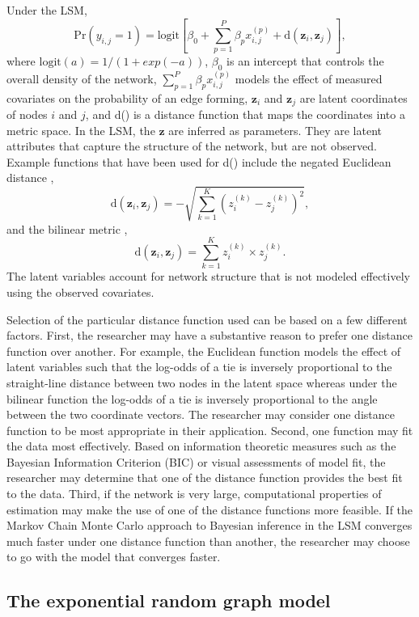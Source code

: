 \documentclass[fleqn,12pt]{wlscirep}
\begin{document}
Under the LSM, $$\text{Pr}(y_{i,j} = 1) = \text{logit}\left[\beta_0 + \sum_{p = 1}^P \beta_p x_{i,j}^{(p)} + \text{d}(\bm{z}_i,\bm{z}_j) \right],$$ where  $\text{logit}(a) = 1/(1+exp(-a))$, $\beta_0$ is an intercept that controls the overall density of the network, $\sum_{p = 1}^P \beta_p x_{i,j}^{(p)}$ models the effect of measured covariates on the probability of an edge forming,  $\bm{z}_i$ and $\bm{z}_j$ are latent coordinates of nodes $i$ and $j$, and d() is a distance function that maps the coordinates into a metric space. In the LSM, the $\bm{z}$ are inferred as parameters. They are latent attributes that capture the structure of the network, but are not observed. Example functions that have been used for d() include the negated Euclidean distance \citep[e.g., ][]{mahmood2017will}, $$ \text{d}(\bm{z}_i,\bm{z}_j)  = -\sqrt{ \sum_{k=1}^K \left( z_i^{(k)} - z_j^{(k)} \right)^2}, $$ and the bilinear metric \citep[e.g., ][]{vance2009social}, $$ \text{d}(\bm{z}_i,\bm{z}_j)  =  \sum_{k=1}^K  z_i^{(k)}\times z_j^{(k)}.  $$ The latent variables account for network structure that is not modeled effectively using the observed covariates. 

Selection of the particular distance function used can be based on a few different factors. First, the researcher may have a substantive reason to prefer one distance function over another. For example, the Euclidean function models the effect of latent variables such that the log-odds of a tie is inversely proportional to the straight-line distance between two nodes in the latent space whereas under the bilinear function the log-odds of a tie is inversely proportional to the angle between the two coordinate vectors. The researcher may consider one distance function to be most appropriate in their application. Second, one function may fit the data most effectively. Based on information theoretic measures such as the Bayesian Information Criterion (BIC) \citep{wang2009wilcoxon} or visual assessments of model fit, the researcher may determine that one of the distance function provides the best fit to the data. Third, if the network is very large, computational properties of estimation may make the use of one of the distance functions more feasible. If the Markov Chain Monte Carlo approach to Bayesian inference in the LSM converges much faster under one distance function than another, the researcher may choose to go with the model that converges faster.



\subsection{The exponential random graph model}
\end{document}
